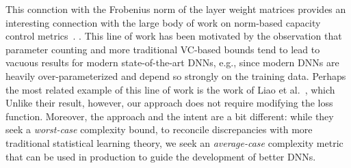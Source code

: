 This connction with the Frobenius norm of the layer weight matrices provides an interesting connection with the large body of work on norm-based capacity control metrics~\cite{XXX-XXX,XXX-XXX,XXX-XXX,XXX-XXX}.
\cite{SHNx17_TR,PLMx18_TR}.
This line of work has been motivated by the observation that parameter counting and more traditional VC-based bounds tend to lead to vacuous results for modern state-of-the-art DNNs, e.g., since modern DNNs are heavily over-parameterized and depend so strongly on the training data.
Perhaps the most related example of this line of work is the work of Liao et al.~\cite{LMBx18_TR}, which 
Unlike their result, however, our approach does not require modifying the loss function.
Moreover, the approach and the intent are a bit different: while they seek a \emph{worst-case} complexity bound, to reconcile discrepancies with more traditional statistical learning theory, we seek an \emph{average-case} complexity metric that can be used in production to guide the development of better DNNs.

